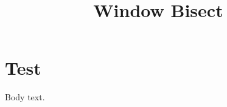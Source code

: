 \documentclass[type=zwischenbericht]{zukunftbau}
\title{Window Bisect}
\begin{document}
\section{Test}
\begin{Window}[title=Test]
Body text.
\end{Window}
\end{document}
